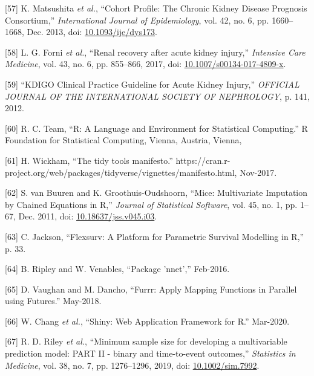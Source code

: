 \documentclass[
]{article}
\newenvironment{cslreferences}%
  {}%
  {\par}
\begin{document}
\begin{cslreferences}
\leavevmode\hypertarget{ref-matsushita_cohort_2013}{}%
{[}57{]} K. Matsushita \emph{et al.}, ``Cohort Profile: The Chronic Kidney Disease Prognosis Consortium,'' \emph{International Journal of Epidemiology}, vol. 42, no. 6, pp. 1660--1668, Dec. 2013, doi: \href{https://doi.org/10.1093/ije/dys173}{10.1093/ije/dys173}.

\leavevmode\hypertarget{ref-forni_renal_2017-1}{}%
{[}58{]} L. G. Forni \emph{et al.}, ``Renal recovery after acute kidney injury,'' \emph{Intensive Care Medicine}, vol. 43, no. 6, pp. 855--866, 2017, doi: \href{https://doi.org/10.1007/s00134-017-4809-x}{10.1007/s00134-017-4809-x}.

\leavevmode\hypertarget{ref-noauthor_kdigo_2012}{}%
{[}59{]} ``KDIGO Clinical Practice Guideline for Acute Kidney Injury,'' \emph{OFFICIAL JOURNAL OF THE INTERNATIONAL SOCIETY OF NEPHROLOGY}, p. 141, 2012.

\leavevmode\hypertarget{ref-r_core_team_r_nodate}{}%
{[}60{]} R. C. Team, ``R: A Language and Environment for Statistical Computing.'' R Foundation for Statistical Computing, Vienna, Austria, Vienna,

\leavevmode\hypertarget{ref-wickham_tidy_2017}{}%
{[}61{]} H. Wickham, ``The tidy tools manifesto.'' https://cran.r-project.org/web/packages/tidyverse/vignettes/manifesto.html, Nov-2017.

\leavevmode\hypertarget{ref-buuren_mice_2011-1}{}%
{[}62{]} S. van Buuren and K. Groothuis-Oudshoorn, ``Mice: Multivariate Imputation by Chained Equations in R,'' \emph{Journal of Statistical Software}, vol. 45, no. 1, pp. 1--67, Dec. 2011, doi: \href{https://doi.org/10.18637/jss.v045.i03}{10.18637/jss.v045.i03}.

\leavevmode\hypertarget{ref-jackson_flexsurv_nodate}{}%
{[}63{]} C. Jackson, ``Flexsurv: A Platform for Parametric Survival Modelling in R,'' p. 33.

\leavevmode\hypertarget{ref-ripley_package_2016}{}%
{[}64{]} B. Ripley and W. Venables, ``Package 'nnet','' Feb-2016.

\leavevmode\hypertarget{ref-vaughan_furrr_2018}{}%
{[}65{]} D. Vaughan and M. Dancho, ``Furrr: Apply Mapping Functions in Parallel using Futures.'' May-2018.

\leavevmode\hypertarget{ref-chang_shiny_2020}{}%
{[}66{]} W. Chang \emph{et al.}, ``Shiny: Web Application Framework for R.'' Mar-2020.

\leavevmode\hypertarget{ref-riley_minimum_2019}{}%
{[}67{]} R. D. Riley \emph{et al.}, ``Minimum sample size for developing a multivariable prediction model: PART II - binary and time-to-event outcomes,'' \emph{Statistics in Medicine}, vol. 38, no. 7, pp. 1276--1296, 2019, doi: \href{https://doi.org/10.1002/sim.7992}{10.1002/sim.7992}.


\end{cslreferences}
\end{document}
